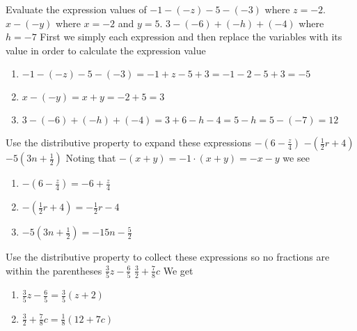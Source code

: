 \begin{ExerciseList}

\Exercise Evaluate the expression values of
\Question $-1 - (-z) - 5 - (-3)$ where $z = -2$.
\Question $x - (-y)$ where $x = -2$ and $y = 5$.
\Question $3 - (-6) + (-h) + (-4)$ where $h = -7$
\Answer First we simply each expression and then replace the variables with its value in  order to calculate the expression value
\begin{enumerate}
\item \myindent $-1 - (-z) - 5 - (-3) = -1 + z - 5 + 3 = -1 - 2 - 5 + 3 = -5$
\item \myindent $x - (-y) = x + y = -2 + 5 = 3$
\item \myindent $3 - (-6) + (-h) + (-4) = 3 + 6 - h - 4 = 5 - h = 5 - (-7) = 12$
\end{enumerate}

\Exercise Use the distributive property to expand these expressions
\Question $-(6 - \frac{z}{4})$
\Question $-(\frac{1}{2}r + 4)$
\Question $-5(3n + \frac{1}{2})$
\Answer Noting that $-(x + y) = -1 \cdot (x+y) = -x - y$ we see
\begin{enumerate}
\item \myindent $-(6 - \frac{z}{4})   = -6 + \frac{z}{4}$
\item \myindent $-(\frac{1}{2}r + 4)  = -\frac{1}{2}r - 4$
\item \myindent $-5(3n + \frac{1}{2}) = -15n - \frac{5}{2}$
\end{enumerate}

\Exercise Use the distributive property to collect these expressions so no fractions are within the parentheses
\Question $\frac{3}{5}z - \frac{6}{5}$
\Question $\frac{3}{2} + \frac{7}{8}c$
\Answer We get
\begin{enumerate}
\item \myindent $\frac{3}{5}z - \frac{6}{5} = \frac{3}{5}(z + 2)$
\item \myindent $\frac{3}{2} + \frac{7}{8}c = \frac{1}{8}(12 + 7c)$
\end{enumerate}


\end{ExerciseList}
